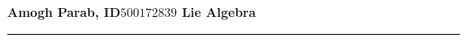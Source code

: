 \documentclass[11pt]{amsart}
\newcommand{\makeheading}[1]%
        {\hspace*{-\marginparsep minus \marginparwidth}%
         \begin{minipage}[t]{\textwidth}%
                {\large \bfseries #1}\\[-0.15\baselineskip]%
                 \rule{\columnwidth}{1pt}%
         \end{minipage}}
\begin{document}
\makeheading{Amogh Parab, ID$500172839$ \hfill Lie Algebra}
\bigskip











%

%

\printbibliography
\end{document}
